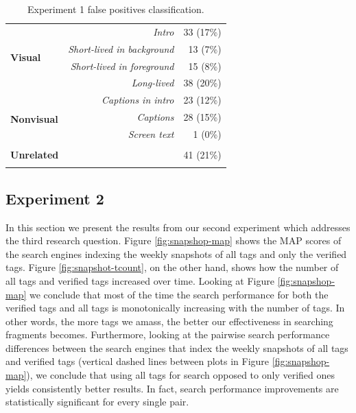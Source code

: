\begin{table}[tb]
\centering
\begin{footnotesize}
\begin{tabular*}{\columnwidth}{@{\extracolsep{\fill}}lrr}
\toprule
\multirow{4}{*}{\textbf{Visual}} & \textit{Intro}  \T \B & 33 (17\%) \\
 & \textit{Short-lived in background} \T \B & 13 (7\%)\\
 & \textit{Short-lived in foreground} \B &  15 (8\%)\\
 & \textit{Long-lived} \B & 38 (20\%)\\
\hline
\multirow{4}{*}{\textbf{Nonvisual}} & \textit{Captions in intro} \B \T & 23 (12\%)\\
 & \textit{Captions} \T \B &  28 (15\%)\\
 & \textit{Screen text} \B & 1 (0\%)\\
 \hline
 &&\\
 \textbf{Unrelated} & &  41 (21\%) \\
 &&\\
\bottomrule
\end{tabular*}
\end{footnotesize}
\caption{Experiment 1 false positives classification.}
\label{tab:exp1-false-pos}
\end{table}


\subsection{Experiment 2}\label{ecir:over-time-results}
In this section we present the results from our second experiment which addresses the third research question. Figure \ref{fig:snapshop-map} shows the MAP scores of the search engines indexing the weekly snapshots of all tags and only the verified tags. Figure \ref{fig:snapshot-tcount}, on the other hand, shows how the number of all tags and verified tags increased over time.
Looking at Figure \ref{fig:snapshop-map} we conclude that most of the time the search performance for both the verified tags and all tags is monotonically increasing with the number of tags. In other words, the more tags we amass, the better our effectiveness in searching fragments becomes. Furthermore, looking at the pairwise search performance differences between the search engines that index the weekly snapshots of all tags and verified tags (vertical dashed lines between plots in Figure \ref{fig:snapshop-map}), we conclude that using all tags for search opposed to only verified ones yields consistently better results. In fact, search performance improvements are statistically significant for every single pair.

